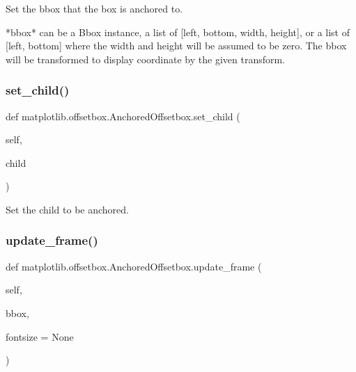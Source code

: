 \begin{DoxyVerb}Set the bbox that the box is anchored to.

*bbox* can be a Bbox instance, a list of [left, bottom, width,
height], or a list of [left, bottom] where the width and
height will be assumed to be zero. The bbox will be
transformed to display coordinate by the given transform.
\end{DoxyVerb}
 \mbox{\label{classmatplotlib_1_1offsetbox_1_1AnchoredOffsetbox_af7f716fb6c070da8478cf642f9c94967}} 
\subsubsection{\texorpdfstring{set\+\_\+child()}{set\_child()}}
{\footnotesize\ttfamily def matplotlib.\+offsetbox.\+Anchored\+Offsetbox.\+set\+\_\+child (\begin{DoxyParamCaption}\item[{}]{self,  }\item[{}]{child }\end{DoxyParamCaption})}

\begin{DoxyVerb}Set the child to be anchored.\end{DoxyVerb}
 \mbox{\label{classmatplotlib_1_1offsetbox_1_1AnchoredOffsetbox_a7459ed38d3d1a5103509b1bf2720d64e}} 
\subsubsection{\texorpdfstring{update\+\_\+frame()}{update\_frame()}}
{\footnotesize\ttfamily def matplotlib.\+offsetbox.\+Anchored\+Offsetbox.\+update\+\_\+frame (\begin{DoxyParamCaption}\item[{}]{self,  }\item[{}]{bbox,  }\item[{}]{fontsize = {\ttfamily None} }\end{DoxyParamCaption})}



